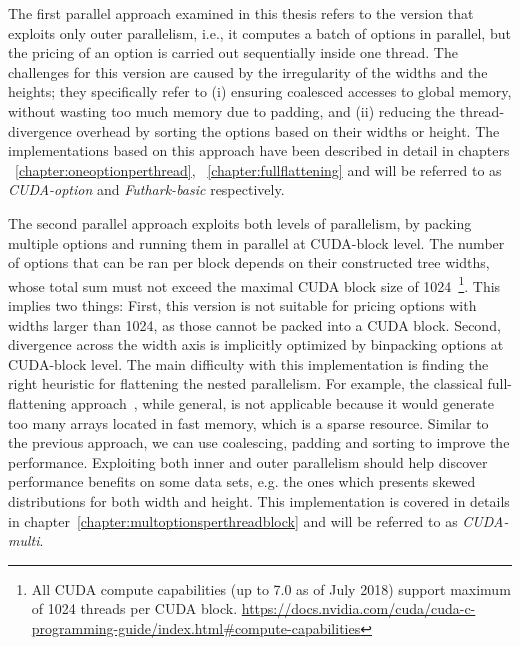 The first parallel approach examined in this thesis refers to the version that exploits only outer parallelism, i.e., it computes a batch of options in parallel, but the pricing of an option is carried out sequentially inside one thread.  The challenges for this version are caused by the irregularity of the widths and the heights; they specifically refer to (i) ensuring coalesced accesses to global memory, without wasting too much memory due to padding, and (ii) reducing the thread-divergence overhead by sorting the options based on their widths or height. The implementations based on this approach have been described in detail in chapters ~\ref{chapter:oneoptionperthread}, ~\ref{chapter:fullflattening} and will be referred to as \textit{CUDA-option} and \textit{Futhark-basic} respectively.

The second parallel approach exploits both levels of parallelism, by packing multiple options and running them in parallel at CUDA-block level. The number of options that can be ran per block depends on their constructed tree widths, whose total sum must not exceed the maximal CUDA block size of 1024~\footnote{All CUDA compute capabilities (up to 7.0 as of July 2018) support maximum of 1024 threads per CUDA block. \url{https://docs.nvidia.com/cuda/cuda-c-programming-guide/index.html#compute-capabilities}}. This implies two things: First, this version is not suitable for pricing options with widths larger than 1024, as those cannot be packed into a CUDA block. Second, divergence across the width axis is implicitly optimized by binpacking options at CUDA-block level. The main difficulty with this implementation is finding the right heuristic for flattening the nested parallelism.  For example, the classical full-flattening approach~\cite{blelloch1994implementation}, while general, is not applicable because it would generate too many arrays located in fast memory, which is a sparse resource. Similar to the previous approach, we can use coalescing, padding and sorting to improve the performance. Exploiting both inner and outer parallelism should help discover performance benefits on some data sets, e.g. the ones which presents skewed distributions for both width and height. This implementation is covered in details in chapter~\ref{chapter:multoptionsperthreadblock} and will be referred to as \textit{CUDA-multi}. 

